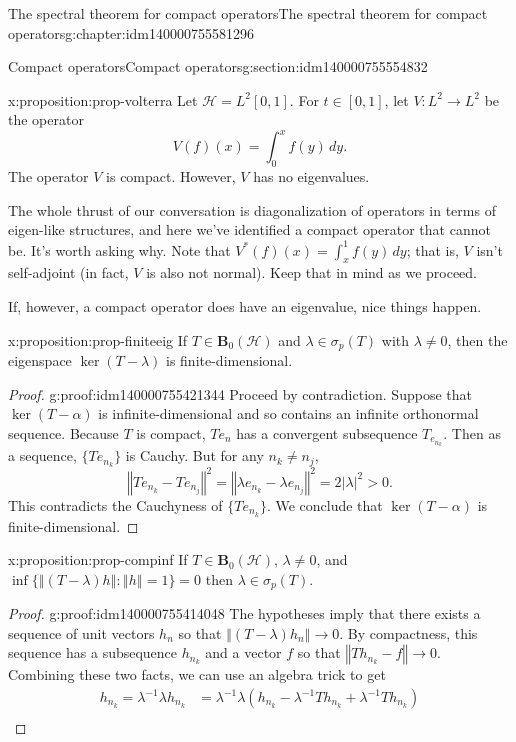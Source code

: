 \documentclass[oneside,10pt,]{book}
\numberwithin{equation}{section}
\newcommand{\hilbert}{\mathcal{H}}
\newcommand{\BOP}{\mathbf{B}}
\newcommand{\abs}[1]{\left\vert#1\right\vert}
\newcommand{\norm}[1]{\left\Vert#1\right\Vert}
\newcommand{\ad}{^\ast}
\newcommand{\inv}{^{-1}}
\newcommand\la{\lambda}
\numberwithin{equation}{section}
\newcommand{\amp}{&}
\begin{document}
\begin{chapterptx}{The spectral theorem for compact operators}{}{The spectral theorem for compact operators}{}{}{g:chapter:idm140000755581296}
\begin{sectionptx}{Compact operators}{}{Compact operators}{}{}{g:section:idm140000755554832}
\begin{proposition}{}{}{x:proposition:prop-volterra}
Let \(\hilbert = L^2[0,1]\). For \(t \in [0,1]\), let \(V:L^2 \to L^2\) be the operator%
\begin{equation*}
V(f)(x) = \int_0^x f(y) \, dy.
\end{equation*}
The operator \(V\) is compact. However, \(V\) has no eigenvalues.%
\end{proposition}
The whole thrust of our conversation is diagonalization of operators in terms of eigen-like structures, and here we've identified a compact operator that cannot be. It's worth asking why. Note that \(V\ad(f)(x) = \int_x^1 f(y) \, dy\); that is, \(V\) isn't self-adjoint (in fact, \(V\) is also not normal). Keep that in mind as we proceed.%
\par
If, however, a compact operator does have an eigenvalue, nice things happen.%
\begin{proposition}{}{}{x:proposition:prop-finiteeig}%
If \(T \in \BOP_0(\hilbert)\) and \(\la \in \sigma_p(T)\) with \(\la \neq 0\), then the eigenspace \(\ker(T - \la)\) is finite-dimensional.%
\end{proposition}
\begin{proof}{}{g:proof:idm140000755421344}
Proceed by contradiction. Suppose that \(\ker(T - \alpha)\) is infinite-dimensional and so contains an infinite orthonormal sequence. Because \(T\) is compact, \(Te_n\) has a convergent subsequence \(T_{e_{n_k}}\). Then as a sequence, \(\{T e_{n_k}\}\) is Cauchy. But for any \(n_k \neq n_j\),%
\begin{equation*}
\norm{T e_{n_k} - T e_{n_j}}^2 = \norm{\la e_{n_k} - \la e_{n_j}}^2 = 2\abs{\la}^2 > 0.
\end{equation*}
This contradicts the Cauchyness of \(\{T e_{n_k}\}\). We conclude that \(\ker(T - \alpha)\) is finite-dimensional.%
\end{proof}
\begin{proposition}{}{}{x:proposition:prop-compinf}%
If \(T \in \BOP_0(\hilbert)\), \(\la \neq 0\), and \(\inf\{\norm{(T - \la)h}: \norm{h}=1\}=0\) then \(\la \in \sigma_p(T)\).%
\end{proposition}
\begin{proof}{}{g:proof:idm140000755414048}
The hypotheses imply that there exists a sequence of unit vectors \(h_n\) so that \(\norm{(T - \la)h_n} \to 0\). By compactness, this sequence has a subsequence \(h_{n_k}\) and a vector \(f\) so that \(\norm{Th_{n_k} - f}\to 0\). Combining these two facts, we can use an algebra trick to get%
\begin{align*}
h_{n_k} = \la\inv \la h_{n_k} \amp= \la\inv \la(h_{n_k}  - \la\inv T h_{n_k} + \la \inv T h_{n_k})\\

\end{align*}
\end{proof}
\end{sectionptx}
\end{chapterptx}
\end{document}
